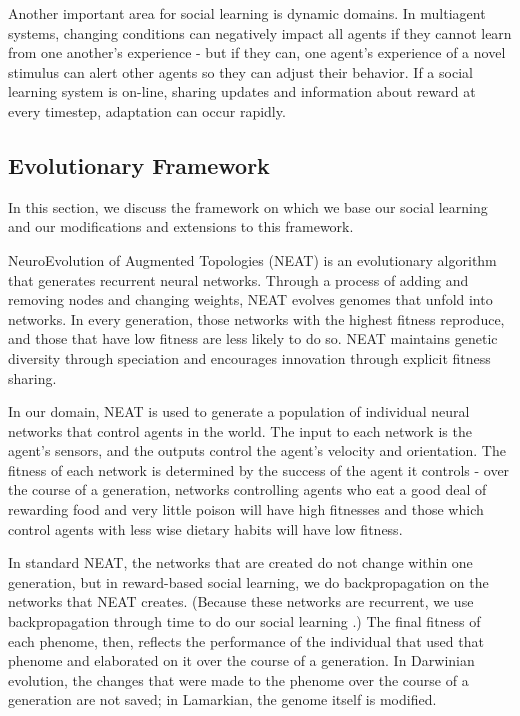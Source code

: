 \documentclass{acm_proc_article-sp}
\begin{document}
Another important area for social learning is dynamic domains. In multiagent systems, changing conditions can negatively impact all agents if they cannot learn from one another's experience - but if they can, one agent's experience of a novel stimulus can alert other agents so they can adjust their behavior. If a social learning system is on-line, sharing updates and information about reward at every timestep, adaptation can occur rapidly.


\subsection*{Evolutionary Framework}
In this section, we discuss the framework on which we base our social learning and our modifications and extensions to this framework.

NeuroEvolution of Augmented Topologies (NEAT)\cite{stanley2002evolving} is an evolutionary algorithm that generates recurrent neural networks. Through a process of adding and removing nodes and changing weights, NEAT evolves genomes that unfold into networks. In every generation, those networks with the highest fitness reproduce, and those that have low fitness are less likely to do so. NEAT maintains genetic diversity through speciation and encourages innovation through explicit fitness sharing.

In our domain, NEAT is used to generate a population of individual neural networks that control agents in the world. The input to each network is the agent's sensors, and the outputs control the agent's velocity and orientation. The fitness of each network is determined by the success of the agent it controls - over the course of a generation, networks controlling agents who eat a good deal of rewarding food and very little poison will have high fitnesses and those which control agents with less wise dietary habits will have low fitness.

In standard NEAT, the networks that are created do not change within one generation, but in reward-based social learning, we do backpropagation\cite{rumelhart1986learning} on the networks that NEAT creates. (Because these networks are recurrent, we use backpropagation through time to do our social learning \cite{werbos1990backpropagation}.) The final fitness of each phenome, then, reflects the performance of the individual that used that phenome and elaborated on it over the course of a generation. In Darwinian evolution, the changes that were made to the phenome over the course of a generation are not saved; in Lamarkian, the genome itself is modified.
\end{document}
